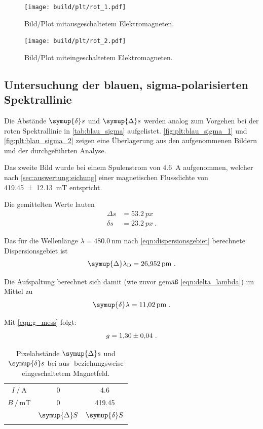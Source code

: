 \begin{figure}[H]
    \centering
    \texttt{[image: build/plt/rot\_1.pdf]}
    \caption{Bild/Plot mitausgeschaltetem Elektromagneten.}
    \label{fig:plt:rot_1}
\end{figure}

\begin{figure}[H]
    \centering
    \texttt{[image: build/plt/rot\_2.pdf]}
    \caption{Bild/Plot miteingeschaltetem Elektromagneten.}
    \label{fig:plt:rot_2}
\end{figure}


\FloatBarrier
\subsection{Untersuchung der blauen, sigma-polarisierten Spektrallinie} \label{sec:auswertung:blau_sigma}
Die Abstände $\symup{\delta} s$ und $\symup{\Delta} s$ werden analog zum Vorgehen bei der roten Spektrallinie
in \autoref{tab:blau_sigma} aufgelistet.
\autoref{fig:plt:blau_sigma_1} und \autoref{fig:plt:blau_sigma_2} zeigen eine Überlagerung
aus den aufgenommenen Bildern und der durchgeführten Analyse.

Das zweite Bild wurde bei einem Spulenstrom von \SI{4.6}{\ampere} aufgenommen,
welcher nach \autoref{sec:auswertung:eichung} einer magnetischen Flussdichte von \SI{419.45 \pm 12.13}{\milli\tesla} entspricht.

Die gemittelten Werte lauten
\begin{align*}
    Δs &= \SI{53.2}{px} \\
    δs &= \SI{23.2}{px} \ .
\end{align*}


Das für die Wellenlänge $\lambda = \SI{480.0}{\nano\meter}$ nach \autoref{eqn:dispersionsgebiet} berechnete Dispersionsgebiet ist
\[
    \symup{\Delta}\lambda_\text{D} = \SI{26.952}{\pico\meter} \ .
\]

Die Aufspaltung berechnet sich damit (wie zuvor gemäß \autoref{eqn:delta_lambda}) im Mittel zu
\[
    \symup{\delta} \lambda = \SI{11.02}{\pico\meter} \ .
\]

Mit \autoref{eqn:g_mess} folgt:
\[
    g = \num{1.30 \pm 0.04} \ .
\]

\begin{table}[H]
    \centering
    \caption{Pixelabstände $\symup{\Delta} s$ und $\symup{\delta} s$ bei aus- beziehungsweise eingeschaltetem Magnetfeld.}
    \label{tab:blau_sigma}
    \begin{tabular}{S S S}
        \toprule
        {$I \mathbin{/} \si{\ampere}$} & 0 & 4.6 \\
        {$B \mathbin{/} \si{\milli\tesla}$} & 0 & 419.45  \\
        \midrule
        & {$\symup{\Delta} S$} & {$\symup{\delta} S$} \\
        \midrule
        \bottomrule
    \end{tabular}
\end{table}

